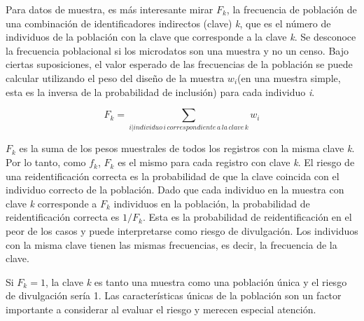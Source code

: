 \documentclass[
]{book}
\newenvironment{Shaded}{\begin{snugshade}}{\end{snugshade}}
\newcommand{\AttributeTok}[1]{\textcolor[rgb]{0.77,0.63,0.00}{#1}}
\newcommand{\CommentTok}[1]{\textcolor[rgb]{0.56,0.35,0.01}{\textit{#1}}}
\newcommand{\FunctionTok}[1]{\textcolor[rgb]{0.00,0.00,0.00}{#1}}
\newcommand{\NormalTok}[1]{#1}
\newcommand{\OtherTok}[1]{\textcolor[rgb]{0.56,0.35,0.01}{#1}}
\newcommand{\SpecialCharTok}[1]{\textcolor[rgb]{0.00,0.00,0.00}{#1}}
\newcommand{\StringTok}[1]{\textcolor[rgb]{0.31,0.60,0.02}{#1}}
\theoremstyle{definition}
\theoremstyle{definition}
\theoremstyle{definition}
\theoremstyle{definition}
\theoremstyle{remark}
\begin{document}
\begin{Shaded}
\end{Shaded}

Para datos de muestra, es más interesante mirar \(F_{k}\), la frecuencia de población de una combinación de identificadores indirectos (clave) \emph{k}, que es el número de individuos de la población con la clave que corresponde a la clave \emph{k}. Se desconoce la frecuencia poblacional si los microdatos son una muestra y no un censo. Bajo ciertas suposiciones, el valor esperado de las frecuencias de la población se puede calcular utilizando el peso del diseño de la muestra \(w_{i}\)(en una muestra simple, esta es la inversa de la probabilidad de inclusión) para cada individuo \emph{i}.

\[F_{k}=\sum_{i|individuo\,i\, correspondiente\, a\, la\, clave\, k} w_{i}\]

\(F_{k}\) es la suma de los pesos muestrales de todos los registros con la misma clave \emph{k}. Por lo tanto, como \(f_{k}\), \(F_{k}\) es el mismo para cada registro con clave \emph{k}. El riesgo de una reidentificación correcta es la probabilidad de que la clave coincida con el individuo correcto de la población. Dado que cada individuo en la muestra con clave \emph{k} corresponde a \(F_{k}\) individuos en la población, la probabilidad de reidentificación correcta es \(1/F_{k}\). Esta es la probabilidad de reidentificación en el peor de los casos y puede interpretarse como riesgo de divulgación. Los individuos con la misma clave tienen las mismas frecuencias, es decir, la frecuencia de la clave.

Si \(F_{k}=1\), la clave \emph{k} es tanto una muestra como una población única y el riesgo de divulgación sería 1. Las características únicas de la población son un factor importante a considerar al evaluar el riesgo y merecen especial atención.
\end{document}
